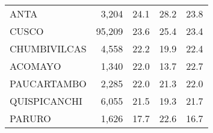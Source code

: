 \begin{tabular}{lrrrr}
	\cellcolor[HTML]{FD6864}ANTA                                       & 3,204                                                                 & 24.1                                                                             & 28.2                                                                        & 23.8                                                                                \\
	\cellcolor[HTML]{FD6864}CUSCO                                      & 95,209                                                                & 23.6                                                                             & 25.4                                                                        & 23.4                                                                                \\
	\cellcolor[HTML]{FD6864}CHUMBIVILCAS                               & 4,558                                                                 & 22.2                                                                             & 19.9                                                                        & 22.4                                                                                \\
	\cellcolor[HTML]{FD6864}ACOMAYO                                    & 1,340                                                                 & 22.0                                                                             & 13.7                                                                        & 22.7                                                                                \\
	\cellcolor[HTML]{FD6864}PAUCARTAMBO                                & 2,285                                                                 & 22.0                                                                             & 21.3                                                                        & 22.0                                                                                \\
	\cellcolor[HTML]{FD6864}QUISPICANCHI                               & 6,055                                                                 & 21.5                                                                             & 19.3                                                                        & 21.7                                                                                \\
	\cellcolor[HTML]{FFCE93}PARURO                                     & 1,626                                                                 & 17.7                                                                             & 22.6                                                                        & 16.7                                                                                \\

\end{tabular}
